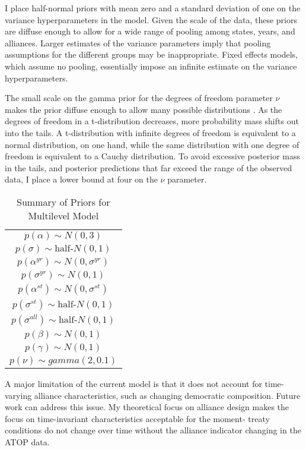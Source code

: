\documentclass[12pt]{article}
\begin{document}
I place half-normal priors with mean zero and a standard deviation of one on the variance hyperparameters in the model. Given the scale of the data, these priors are diffuse enough to allow for a wide range of pooling among states, years, and alliances. Larger estimates of the variance parameters imply that pooling assumptions for the different groups may be inappropriate. Fixed effects models, which assume no pooling, essentially impose an infinite estimate on the variance hyperparameters. 

The small scale on the gamma prior for the degrees of freedom parameter $\nu$ makes the prior diffuse enough to allow many possible distributions \citep{JuarezSteele2010}. As the degrees of freedom in a t-distribution decreases, more probability mass shifts out into the tails. A t-distribution with infinite degrees of freedom is equivalent to a normal distribution, on one hand, while the same distribution with one degree of freedom is equivalent to a Cauchy distribution. To avoid excessive posterior mass in the tails, and posterior predictions that far exceed the range of the observed data, I place a lower bound at four on the $\nu$ parameter. 


\begin{table} %

 \begin{center}
\begin{tabular}{c} 
$ p(\alpha) \sim N(0, 3)$  \\
$ p(\sigma) \sim \mbox{half-}N(0, 1) $ \\
$ p(\alpha^{yr}) \sim N(0, \sigma^{yr}) $ \\ 
$ p(\sigma^{yr}) \sim N(0, 1) $ \\
$ p(\alpha^{st}) \sim N(0, \sigma^{st}) $ \\ 
$ p(\sigma^{st}) \sim \mbox{half-}N(0, 1) $ \\ 
$ p(\sigma^{all}) \sim \mbox{half-}N(0, 1) $ \\
$ p(\beta) \sim N(0, 1) $ \\
$ p(\gamma) \sim N(0, 1) $ \\ 
$ p(\nu) \sim gamma(2, 0.1)$ 
\end{tabular} 
\end{center} 

\caption{Summary of Priors for Multilevel Model}
\label{tab:priors}
\end{table} 

A major limitation of the current model is that it does not account for time-varying alliance characteristics, such as changing democratic composition. Future work can address this issue. My theoretical focus on alliance design makes the focus on time-invariant characteristics acceptable for the moment- treaty conditions do not change over time without the alliance indicator changing in the ATOP data. 
\end{document}
